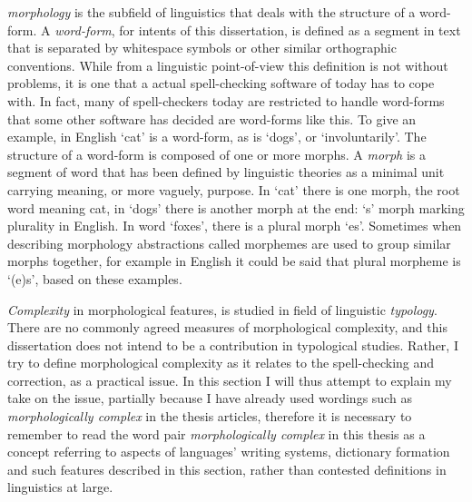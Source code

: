 \documentclass[officiallayout]{unihelcompling}
\begin{document}
\emph{\Gls{morphology}} is the subfield of linguistics that deals with the
structure of a word-form. A \emph{\gls{word-form}}, for intents of this
dissertation, is defined as a segment in text that is separated by whitespace
symbols or other similar orthographic conventions. While from a linguistic
point-of-view this definition is not without problems, it is one that a actual
spell-checking software of today has to cope with. In fact, many of
spell-checkers today are restricted to handle word-forms that some other
software has decided are word-forms like this. To give an example, in English
`cat' is a word-form, as is `dogs', or `involuntarily'. The structure of a
word-form is composed of one or more morphs. A \emph{\gls{morph}} is a segment
of word that has been defined by linguistic theories as a minimal unit carrying
meaning, or more vaguely, purpose. In `cat' there is one morph, the root word
meaning cat, in `dogs' there is another morph at the end: `s' morph marking
plurality in English. In word `foxes', there is a plural morph `es'. Sometimes
when describing morphology abstractions called \glspl{morpheme} are used to
group similar morphs together, for example in English it could be said that
plural morpheme is `(e)s', based on these examples.

\emph{Complexity} in morphological features, is studied in field of linguistic
\emph{typology}. There are no commonly agreed measures of morphological
complexity, and this dissertation does not intend to be a contribution in
typological studies. Rather, I try to define morphological complexity as it
relates to the spell-checking and correction, as a practical issue. In this
section I will thus attempt to explain my take on the issue, partially because
I have already used wordings such as \emph{morphologically complex} in the
thesis articles, therefore it is necessary to remember to read the word pair
\emph{morphologically complex} in this thesis as a concept referring to aspects
of languages' writing systems, dictionary formation and such features described
in this section, rather than contested definitions in linguistics at large.
\end{document}
